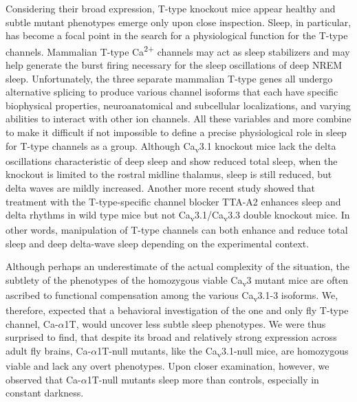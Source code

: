 Considering their broad expression, T-type knockout mice appear healthy and subtle mutant phenotypes emerge only upon close inspection.
Sleep, in particular, has become a focal point in the search for a physiological function for the T-type channels.
Mammalian T-type Ca\textsuperscript{2+} channels may act as sleep stabilizers and may help generate the burst firing necessary for the sleep oscillations of deep NREM sleep.
Unfortunately, the three separate mammalian T-type genes all undergo alternative splicing to produce various channel isoforms that each have specific biophysical properties, neuroanatomical and subcellular localizations, and varying abilities to interact with other ion channels.
All these variables and more combine to make it difficult if not impossible to define a precise physiological role in sleep for T-type channels as a group.
Although Ca\textsubscript{v}3.1 knockout mice lack the delta oscillations characteristic of deep sleep and show reduced total sleep\cite{Lee:2004ey}, when the knockout is limited to the rostral midline thalamus, sleep is still reduced, but delta waves are mildly increased\cite{anderson:2005aa}. Another more recent study showed that treatment with the T-type-specific channel blocker TTA-A2 enhances sleep and delta rhythms in wild type mice but not Ca\textsubscript{v}3.1/Ca\textsubscript{v}3.3 double knockout mice\cite{kraus:2010aa}. In other words, manipulation of T-type channels can both enhance and reduce total sleep and deep delta-wave sleep depending on the experimental context.

Although perhaps an underestimate of the actual complexity of the situation, the subtlety of the phenotypes of the homozygous viable Ca\textsubscript{v}3 mutant mice are often ascribed to functional compensation among the various Ca\textsubscript{v}3.1-3 isoforms\cite{senatore:2012aa}.
We, therefore, expected that a behavioral investigation of the one and only fly T-type channel, Ca-$\alpha$1T, would uncover less subtle sleep phenotypes.
We were thus surprised to find, that despite its broad and relatively strong expression across adult fly brains, Ca-$\alpha$1T-null mutants, like the Ca\textsubscript{v}3.1-null mice, are homozygous viable and lack any overt phenotypes.
Upon closer examination, however, we observed that Ca-$\alpha$1T-null mutants sleep more than controls, especially in constant darkness.

